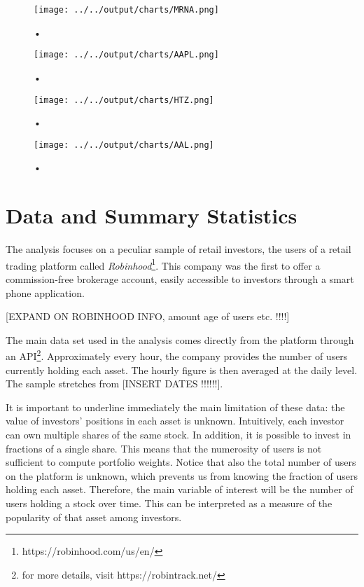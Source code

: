 \documentclass[12pt]{article}
\numberwithin{equation}{section} %
\begin{document}
\begin{figure}[h!]
\caption{•}
\centering
\texttt{[image: ../../output/charts/MRNA.png]}
\end{figure}

\begin{figure}[h!]
\caption{•}
\centering
\texttt{[image: ../../output/charts/AAPL.png]}
\end{figure}

\begin{figure}[h!]
\caption{•}
\centering
\texttt{[image: ../../output/charts/HTZ.png]}
\end{figure}

\begin{figure}[h!]
\caption{•}
\centering
\texttt{[image: ../../output/charts/AAL.png]}
\end{figure}



\section{Data and Summary Statistics}

The analysis focuses on a peculiar sample of retail investors, the users of a retail trading platform called \textit{Robinhood}\footnote{https://robinhood.com/us/en/}. This company was the first to offer a commission-free brokerage account, easily accessible to investors through a smart phone application. 

[EXPAND ON ROBINHOOD INFO, amount age of users etc. !!!!]


The main data set used in the analysis comes directly from the platform through an API\footnote{for more details, visit https://robintrack.net/}. Approximately every hour, the company provides the number of users currently holding each asset. The hourly figure is then averaged at the daily level. The sample stretches from [INSERT DATES !!!!!!].

It is important to underline immediately the main limitation of these data: the value of investors' positions in each asset is unknown. Intuitively, each investor can own multiple shares of the same stock. In addition, it is possible to invest in fractions of a single share. This means that the numerosity of users is not sufficient to compute portfolio weights. Notice that also the total number of users on the platform is unknown, which prevents us from knowing the fraction of users holding each asset. Therefore, the main variable of interest will be the number of users holding a stock over time. This can be interpreted as a measure of the popularity of that asset among investors.
\end{document}

